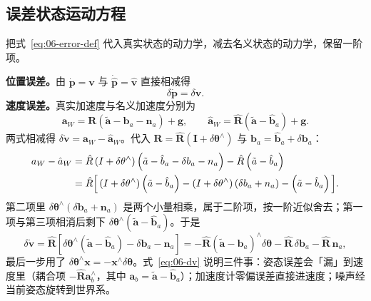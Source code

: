 \subsection{误差状态运动方程}

把式~\eqref{eq:06-error-def} 代入真实状态的动力学，减去名义状态的动力学，保留一阶项。

\textbf{位置误差。}由 $\dot{\bm{p}}=\bm{v}$ 与 $\dot{\hat{\bm{p}}}=\hat{\bm{v}}$ 直接相减得
\begin{equation}
  \delta\dot{\bm{p}} = \delta\bm{v}.
  \label{eq:06-dp}
\end{equation}
\textbf{速度误差。}真实加速度与名义加速度分别为
\begin{equation}
  \bm{a}_W = \bm{R}\left(\tilde{\bm{a}}-\bm{b}_a-\bm{n}_a\right)+\bm{g},
  \qquad
  \hat{\bm{a}}_W = \hat{\bm{R}}\left(\tilde{\bm{a}}-\hat{\bm{b}}_a\right)+\bm{g}.
\end{equation}
两式相减得 $\delta\dot{\bm{v}}=\bm{a}_W-\hat{\bm{a}}_W$。代入 $\bm{R}=\hat{\bm{R}}(\bm{I}+\delta\bm{\theta}^{\wedge})$ 与 $\bm{b}_a=\hat{\bm{b}}_a+\delta\bm{b}_a$：
\begin{align}
  a_W-\hat{a}_W
  &= \hat{R}\left(I+\delta\theta^{\wedge}\right)
     \left(\tilde{a}-\hat{b}_a-\delta b_a-n_a\right)
     - \hat{R}\left(\tilde{a}-\hat{b}_a\right) \notag\\
  &= \hat{R}\Big[\left(I+\delta\theta^{\wedge}\right)\left(\tilde{a}-\hat{b}_a\right)
     -\left(I+\delta\theta^{\wedge}\right)\left(\delta b_a+n_a\right)
     -\left(\tilde{a}-\hat{b}_a\right)\Big].
\end{align}
第二项里 $\delta\bm{\theta}^{\wedge}(\delta\bm{b}_a+\bm{n}_a)$ 是两个小量相乘，属于二阶项，按一阶近似舍去；第一项与第三项相消后剩下 $\delta\bm{\theta}^{\wedge}(\tilde{\bm{a}}-\hat{\bm{b}}_a)$。于是
\begin{equation}
  \delta\dot{\bm{v}}
  = \hat{\bm{R}}\left[\delta\bm{\theta}^{\wedge}\left(\tilde{\bm{a}}-\hat{\bm{b}}_a\right)
    -\delta\bm{b}_a-\bm{n}_a\right]
  = -\hat{\bm{R}}\left(\tilde{\bm{a}}-\hat{\bm{b}}_a\right)^{\wedge}\delta\bm{\theta}
    -\hat{\bm{R}}\,\delta\bm{b}_a-\hat{\bm{R}}\,\bm{n}_a,
  \label{eq:06-dv}
\end{equation}
最后一步用了 $\delta\bm{\theta}^{\wedge}\bm{x}=-\bm{x}^{\wedge}\delta\bm{\theta}$。式~\eqref{eq:06-dv} 说明三件事：姿态误差会「漏」到速度里（耦合项 $-\hat{\bm{R}}\bm{a}_b^{\wedge}$，其中 $\bm{a}_b=\tilde{\bm{a}}-\hat{\bm{b}}_a$）；加速度计零偏误差直接进速度；噪声经当前姿态旋转到世界系。


